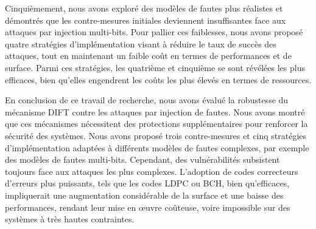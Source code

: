 Cinquièmement, nous avons exploré des modèles de fautes plus réalistes et démontrés que les contre-mesures initiales deviennent insuffisantes face aux attaques par injection multi-bits. Pour pallier ces faiblesses, nous avons proposé quatre stratégies d'implémentation visant à réduire le taux de succès des attaques, tout en maintenant un faible coût en termes de performances et de surface. Parmi ces stratégies, les quatrième et cinquième se sont révélées les plus efficaces, bien qu’elles engendrent les coûts les plus élevés en termes de ressources.

En conclusion de ce travail de recherche, nous avons évalué la robustesse du mécanisme DIFT contre les attaques par injection de fautes. Nous avons montré que ces mécanismes nécessitent des protections supplémentaires pour renforcer la sécurité des systèmes. Nous avons proposé trois contre-mesures et cinq stratégies d’implémentation adaptées à différents modèles de fautes complexes, par exemple des modèles de fautes multi-bits. Cependant, des vulnérabilités subsistent toujours face aux attaques les plus complexes. L’adoption de codes correcteurs d’erreurs plus puissants, tels que les codes LDPC ou BCH, bien qu’efficaces, impliquerait une augmentation considérable de la surface et une baisse des performances, rendant leur mise en œuvre coûteuse, voire impossible sur des systèmes à très hautes contraintes.